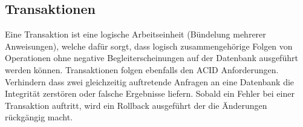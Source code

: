 \documentclass[12pt,a4paper]{article}
\begin{document}
	\subsection{Transaktionen}
		Eine Transaktion ist eine logische Arbeitseinheit (Bündelung mehrerer Anweisungen), welche dafür sorgt, dass logisch zusammengehörige Folgen von Operationen ohne negative Begleiterscheinungen auf der Datenbank ausgeführt werden können. Transaktionen folgen ebenfalls den ACID Anforderungen. Verhindern dass zwei gleichzeitig auftretende Anfragen an eine Datenbank die Integrität zerstören oder falsche Ergebnisse liefern. Sobald ein Fehler bei einer Transaktion auftritt, wird ein Rollback ausgeführt der die Änderungen rückgängig macht.
\end{document}
